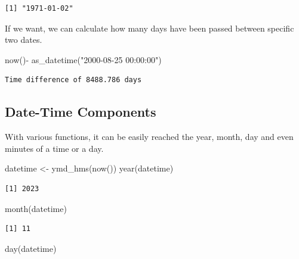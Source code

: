 \documentclass[
  letterpaper,
  DIV=11,
  numbers=noendperiod]{scrartcl}
\newenvironment{Shaded}{\begin{snugshade}}{\end{snugshade}}
\newcommand{\FunctionTok}[1]{\textcolor[rgb]{0.28,0.35,0.67}{#1}}
\newcommand{\NormalTok}[1]{\textcolor[rgb]{0.00,0.23,0.31}{#1}}
\newcommand{\OtherTok}[1]{\textcolor[rgb]{0.00,0.23,0.31}{#1}}
\newcommand{\SpecialCharTok}[1]{\textcolor[rgb]{0.37,0.37,0.37}{#1}}
\newcommand{\StringTok}[1]{\textcolor[rgb]{0.13,0.47,0.30}{#1}}
\begin{document}
\begin{verbatim}
[1] "1971-01-02"
\end{verbatim}

If we want, we can calculate how many days have been passed between
specific two dates.

\begin{Shaded}
\begin{Highlighting}[]
\FunctionTok{now}\NormalTok{()}\SpecialCharTok{{-}} \FunctionTok{as\_datetime}\NormalTok{(}\StringTok{"2000{-}08{-}25 00:00:00"}\NormalTok{)}
\end{Highlighting}
\end{Shaded}

\begin{verbatim}
Time difference of 8488.786 days
\end{verbatim}

\hypertarget{date-time-components}{%
\subsection{Date-Time Components}\label{date-time-components}}

With various functions, it can be easily reached the year, month, day
and even minutes of a time or a day.

\begin{Shaded}
\begin{Highlighting}[]
\NormalTok{datetime }\OtherTok{\textless{}{-}} \FunctionTok{ymd\_hms}\NormalTok{(}\FunctionTok{now}\NormalTok{()) }
\FunctionTok{year}\NormalTok{(datetime) }
\end{Highlighting}
\end{Shaded}

\begin{verbatim}
[1] 2023
\end{verbatim}

\begin{Shaded}
\begin{Highlighting}[]
\FunctionTok{month}\NormalTok{(datetime) }
\end{Highlighting}
\end{Shaded}

\begin{verbatim}
[1] 11
\end{verbatim}

\begin{Shaded}
\begin{Highlighting}[]
\FunctionTok{day}\NormalTok{(datetime) }
\end{Highlighting}
\end{Shaded}
\end{document}
